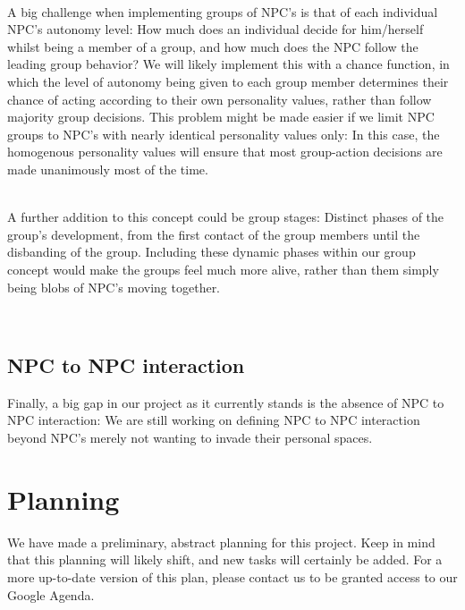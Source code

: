 \documentclass[11pt]{article} %
\begin{document}
~\\
A big challenge when implementing groups of NPC's is that of each individual NPC's autonomy level: How much does an individual decide for him/herself whilst being a member of a group, and how much does the NPC follow the leading group behavior? We will likely implement this with a chance function, in which the level of autonomy being given to each group member determines their chance of acting according to their own personality values, rather than follow majority group decisions. This problem might be made easier if we limit NPC groups to NPC's with nearly identical personality values only: In this case, the homogenous personality values will ensure that most group-action decisions are made unanimously most of the time.

~\\
A further addition to this concept could be group stages: Distinct phases of the group's development, from the first contact of the group members until the disbanding of the group. Including these dynamic phases within our group concept would make the groups feel much more alive, rather than them simply being blobs of NPC's moving together.

~\\
\subsection{NPC to NPC interaction}
Finally, a big gap in our project as it currently stands is the absence of NPC to NPC interaction: We are still working on defining NPC to NPC interaction beyond NPC's merely not wanting to invade their personal spaces.

\newpage
\section{Planning}
We have made a preliminary, abstract planning for this project. Keep in mind that this planning will likely shift, and new tasks will certainly be added. For a more up-to-date version of this plan, please contact us to be granted access to our Google Agenda.
\end{document}

